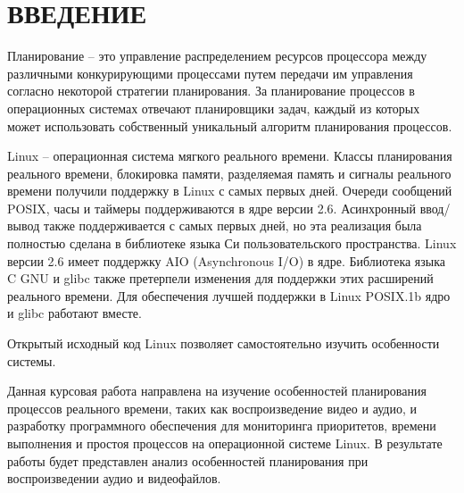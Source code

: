 \section*{ВВЕДЕНИЕ}

Планирование -- это управление распределением ресурсов процессора между различными конкурирующими процессами путем передачи им управления согласно некоторой стратегии планирования. За планирование процессов в операционных системах отвечают планировщики задач, каждый из которых может использовать собственный уникальный алгоритм планирования процессов.

Linux -- операционная система мягкого реального времени. Классы планирования реального времени, блокировка памяти, разделяемая память и сигналы реального времени получили поддержку в Linux с самых первых дней. Очереди сообщений POSIX, часы и таймеры поддерживаются в ядре версии 2.6. Асинхронный ввод/вывод также поддерживается с самых первых дней, но эта реализация была полностью сделана в библиотеке языка Си пользовательского пространства. Linux версии 2.6 имеет поддержку AIO (Asynchronous I/O) в ядре. Библиотека языка C GNU и glibc также претерпели изменения для поддержки этих расширений реального времени. Для обеспечения лучшей поддержки в Linux POSIX.1b ядро и glibc работают вместе.

Открытый исходный код Linux позволяет самостоятельно изучить особенности системы.

Данная курсовая работа направлена на изучение особенностей планирования процессов реального времени, таких как воспроизведение видео и аудио, и разработку программного обеспечения для мониторинга приоритетов, времени выполнения и простоя процессов на операционной системе Linux. В результате работы будет представлен анализ особенностей планирования при воспроизведении аудио и видеофайлов.

\pagebreak
